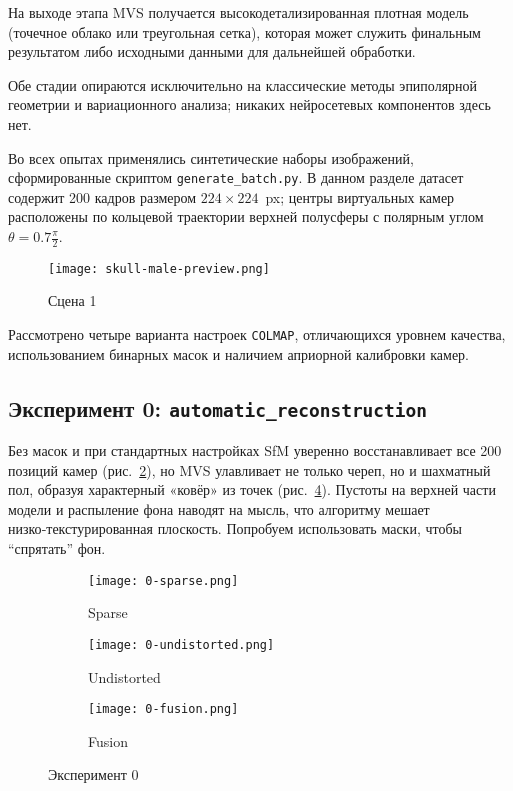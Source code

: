 \begin{enumerate}
  На выходе этапа MVS получается высокодетализированная
  плотная модель (точечное облако или треугольная сетка), которая
  может служить финальным результатом либо исходными данными для
  дальнейшей обработки.
\end{enumerate}

\noindent Обе стадии опираются исключительно на классические методы эпиполярной геометрии
и вариационного анализа; никаких нейросетевых компонентов здесь нет.

Во всех опытах применялись синтетические наборы изображений, сформированные
скриптом \texttt{generate\_batch.py}. В данном разделе датасет содержит 200
кадров размером $224\times224$~px; центры виртуальных камер расположены по
кольцевой траектории верхней полусферы с полярным углом $\theta = 0.7\frac{\pi}{2}$.

\begin{figure}[h]
    \centering
    \texttt{[image: skull-male-preview.png]}
    \caption{Сцена 1}
    \label{fig:scene1}
\end{figure}

Рассмотрено четыре варианта настроек \texttt{COLMAP}, отличающихся уровнем
качества, использованием бинарных масок и наличием априорной калибровки камер.

\subsection{Эксперимент 0: \texttt{automatic\_reconstruction}}

Без масок и при стандартных настройках SfM уверенно восстанавливает все 200
позиций камер (рис.~\ref{fig:0sparse}), но MVS улавливает не только череп, но и
шахматный пол, образуя характерный «ковёр» из точек (рис.~\ref{fig:0fusion}).
Пустоты на верхней части модели и распыление фона наводят на мысль, что
алгоритму мешает низко‑текстурированная плоскость. Попробуем использовать маски,
чтобы ``спрятать'' фон.

\begin{figure}[h]
    \centering
    \begin{subfigure}[b]{0.3\textwidth}
        \texttt{[image: 0-sparse.png]}
        \caption{Sparse}
        \label{fig:0sparse}
    \end{subfigure}
    \hfill
    \begin{subfigure}[b]{0.3\textwidth}
        \texttt{[image: 0-undistorted.png]}
        \caption{Undistorted}
        \label{fig:0undistorted}
    \end{subfigure}
    \hfill
    \begin{subfigure}[b]{0.3\textwidth}
        \texttt{[image: 0-fusion.png]}
        \caption{Fusion}
        \label{fig:0fusion}
    \end{subfigure}
    \caption{Эксперимент 0}
    \label{fig:0exp}
\end{figure}

